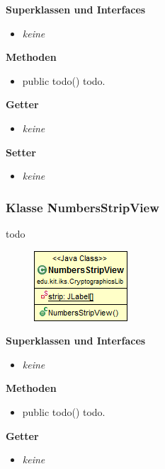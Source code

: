 \documentclass{article}
\begin{document}
      \textbf{Superklassen und Interfaces}
      \begin{itemize}
        \item \textit{keine}
      \end{itemize}
	
      \textbf{Methoden}
      \begin{itemize}
        \item public todo() \newline
          todo.
      \end{itemize}
      
      \textbf{Getter}
      \begin{itemize}
		\item \textit{keine}
      \end{itemize}
      
      \textbf{Setter}
      \begin{itemize}
        \item \textit{keine}
      \end{itemize}
	
	\subsubsection{Klasse NumbersStripView}
	  todo
	
      \begin{figure}[H]
        \centering
        \includegraphics{resources/edu-kit-iks-CryptographicsLib-NumbersStripView}
      \end{figure}
	
      \textbf{Superklassen und Interfaces}
      \begin{itemize}
        \item \textit{keine}
      \end{itemize}
	
      \textbf{Methoden}
      \begin{itemize}
        \item public todo() \newline
          todo.
      \end{itemize}
      
      \textbf{Getter}
      \begin{itemize}
		\item \textit{keine}
      \end{itemize}
      
\end{document}
